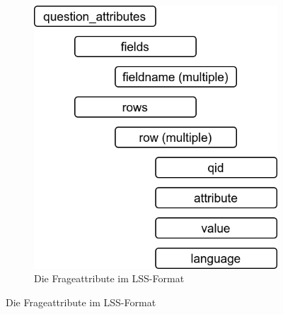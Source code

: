 \begin{figure}[h]
\begin{minipage}[b]{.45\textwidth}
\begin{subfigure}[b]{\linewidth}
			\includegraphics[width=.95\textwidth]{./img/append_lss_q_attr.png}
			\caption{Die Frageattribute im LSS-Format}
		\end{subfigure}%
	\end{minipage}
\end{figure}

